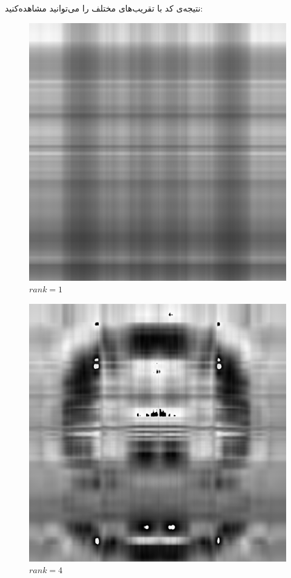 نتیجه‌ی کد با تقریب‌های مختلف را می‌توانید مشاهده‌کنید:

\begin{figure}
  \includegraphics[width=\linewidth]{../image-compression/cat-1.png}
  \caption{$rank=1$}
  \label{fig:cat-bw-rank-1}
\end{figure}

\begin{figure}
  \includegraphics[width=\linewidth]{../image-compression/cat-4.png}
  \caption{$rank=4$}
  \label{fig:cat-bw-rank-4}
\end{figure}


